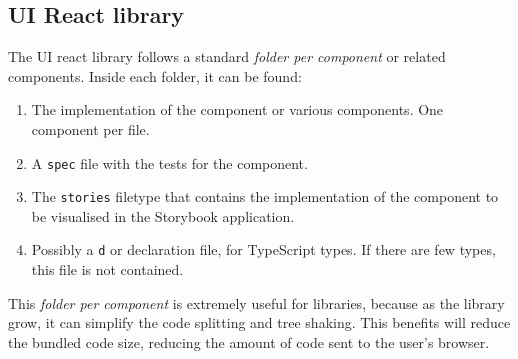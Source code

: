 \documentclass[./memory.tex]{subfiles}
\begin{document}
\subsection{UI React library}
The UI react library follows a standard \emph{folder per component} or related
components. Inside each folder, it can be found:
\begin{enumerate}[label = -]
	\item The implementation of the component or various components. One component
	      per file.
	\item A \texttt{spec} file with the tests for the component.
	\item The \texttt{stories} filetype that contains the implementation of the
	      component to be visualised in the Storybook application.
	\item Possibly a \texttt{d} or declaration file, for TypeScript types. If
	      there are few types, this file is not contained.
\end{enumerate}
This \emph{folder per component} is extremely useful for libraries, because as
the library grow, it can simplify the code splitting and tree shaking. This
benefits will reduce the bundled code size, reducing the amount of code sent to
the user's browser.
\end{document}
